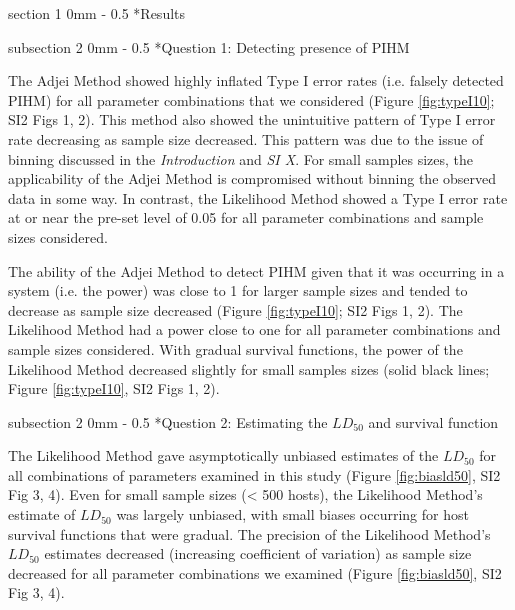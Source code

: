\documentclass[12pt, a4paper]{article}
\makeatletter
\renewcommand{\section}{\@startsection
{section}%
{1}%
{0mm}%
{-\baselineskip}%
{0.5\baselineskip}%
{\normalfont\bf\large}} %
\renewcommand{\subsection}{\@startsection
{subsection}%
{2}%
{0mm}%
{-\baselineskip}%
{0.5\baselineskip}%
{\normalfont\bf}} %
\makeatother
\begin{document}
\section*{Results}

\subsection*{Question 1: Detecting presence of PIHM}

The Adjei Method showed highly inflated Type I error rates (i.e. falsely detected
PIHM) for all parameter combinations that we
considered (Figure \ref{fig:typeI10}; SI2 Figs 1, 2).  This method also showed the unintuitive pattern of Type I error
rate decreasing as sample size decreased.  This pattern was due to the issue of
binning discussed in the \emph{Introduction} and \emph{SI X}. For small samples sizes, the
applicability of the Adjei Method is compromised without binning the observed
data in some way.  In contrast, the Likelihood Method showed a Type I
error rate at or near the pre-set level of 0.05 for all parameter combinations
and sample sizes considered.

The ability of the Adjei Method to detect PIHM given that it was occurring in a
system (i.e. the power) was close to 1 for larger sample sizes and tended to
decrease as sample size decreased (Figure \ref{fig:typeI10}; SI2 Figs 1, 2).  The Likelihood Method had a power close to
one for all parameter combinations and sample sizes considered.  With gradual
survival functions, the power of the Likelihood Method decreased slightly for small samples sizes (solid black lines; Figure \ref{fig:typeI10}, SI2 Figs 1, 2).


\subsection*{Question 2: Estimating the $LD_{50}$ and survival function}

The Likelihood Method gave asymptotically unbiased estimates of the $LD_{50}$
for all combinations of parameters examined in this study (Figure \ref{fig:biasld50}, SI2 Fig 3, 4).  Even for
small sample sizes (< 500 hosts), the Likelihood Method's estimate of $LD_{50}$
was largely unbiased, with small biases occurring for host survival functions
that were gradual. The precision of the Likelihood Method's $LD_{50}$ estimates decreased
(increasing coefficient of variation) as sample size decreased for all
parameter combinations we examined (Figure \ref{fig:biasld50}, SI2 Fig 3, 4).
\end{document}
